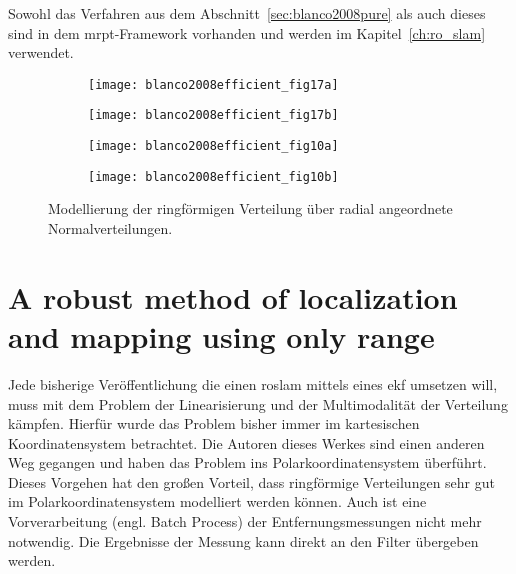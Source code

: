 Sowohl das Verfahren aus dem Abschnitt~\ref{sec:blanco2008pure} als auch dieses sind in dem \Gls{mrpt}-Framework vorhanden und werden im Kapitel~\ref{ch:ro_slam} verwendet.

\begin{figure}[!ht]
	\begin{subfigure}[t]{0.24\linewidth}
		\texttt{[image: blanco2008efficient\_fig17a]}
		\caption{}
		\label{fig:blanco2008efficient_fig17a}
	\end{subfigure}
	\hfill
	\begin{subfigure}[t]{0.24\linewidth}
		\texttt{[image: blanco2008efficient\_fig17b]}
		\caption{}
		\label{fig:blanco2008efficient_fig17b}
	\end{subfigure}
	\hfill
	\begin{subfigure}[t]{0.24\linewidth}
		\texttt{[image: blanco2008efficient\_fig10a]}
		\caption{}
		\label{fig:blanco2008efficient_fig10a}
	\end{subfigure}
	\hfill
	\begin{subfigure}[t]{0.24\linewidth}
		\texttt{[image: blanco2008efficient\_fig10b]}
		\caption{}
		\label{fig:blanco2008efficient_fig10b}
	\end{subfigure}
	\caption{Modellierung der ringförmigen Verteilung über radial angeordnete Normalverteilungen.}
	\label{fig:blanco2008efficient}
\end{figure}


%
%
\section{A robust method of localization and mapping using only range}

Jede bisherige Veröffentlichung die einen \Gls{roslam} mittels eines \Gls{ekf} umsetzen will, muss mit dem Problem der Linearisierung und der Multimodalität der Verteilung kämpfen. Hierfür wurde das Problem bisher immer im kartesischen Koordinatensystem betrachtet. Die Autoren dieses Werkes \cite{djugash2009robust} sind einen anderen Weg gegangen und haben das Problem ins Polarkoordinatensystem überführt. Dieses Vorgehen hat den großen Vorteil, dass ringförmige Verteilungen sehr gut im Polarkoordinatensystem modelliert werden können. Auch ist eine Vorverarbeitung (engl. Batch Process) der Entfernungsmessungen nicht mehr notwendig. Die Ergebnisse der Messung kann direkt an den Filter übergeben werden.

